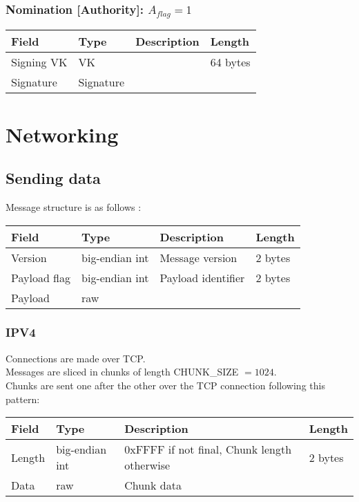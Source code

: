 \documentclass[a4paper,10pt]{article}
\begin{document}
                \subsubsection{Nomination [Authority]: $A_{flag} = 1$}
                    \begin{tabularx}{\textwidth}{|l|l|X|l|}
                        \hline Field & Type & Description & Length \\ \hline
                        \hline Signing VK & VK &  & 64 bytes \\
                        \hline Signature & Signature & & \\
                        \hline
                    \end{tabularx}
    \section{Networking}
        \subsection{Sending data}
            Message structure is as follows :\\
            \begin{tabularx}{\textwidth}{|l|l|X|l|}
                \hline Field & Type & Description & Length \\ \hline
                \hline Version & big-endian int & Message version & 2 bytes \\
                \hline Payload flag & big-endian int & Payload identifier & 2 bytes \\
                \hline Payload & raw &  & \\
                \hline
            \end{tabularx}
            \subsubsection{IPV4}
                Connections are made over TCP.\\
                Messages are sliced in chunks of length CHUNK\_SIZE $=1024$.\\
                Chunks are sent one after the other over the TCP connection following this pattern:
                
                \noindent\begin{tabularx}{\textwidth}{|l|l|X|l|}
                    \hline Field & Type & Description & Length \\ \hline
                    \hline Length & big-endian int & 0xFFFF if not final, Chunk length otherwise & 2 bytes \\
                    \hline Data & raw & Chunk data & \\
                    \hline
                \end{tabularx}
\end{document}
